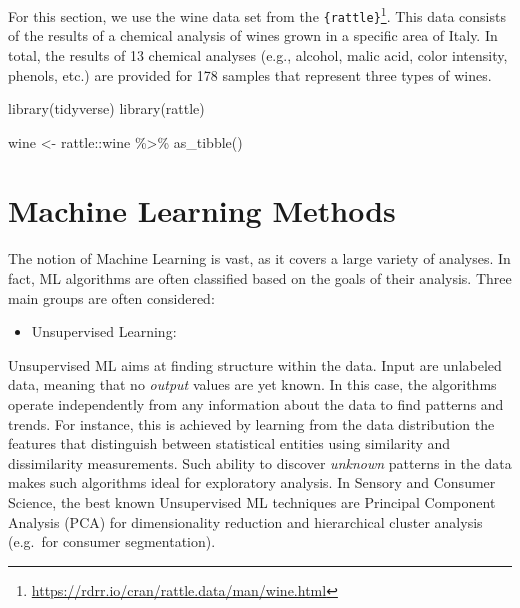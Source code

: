 \documentclass[
]{krantz}
\makeatletter
\newenvironment{Shaded}{\begin{snugshade}}{\end{snugshade}}
\newcommand{\FunctionTok}[1]{\textcolor[rgb]{0,0,0}{#1}}
\newcommand{\NormalTok}[1]{#1}
\newcommand{\OtherTok}[1]{\textcolor[rgb]{0.37,0.37,0.37}{#1}}
\newcommand{\SpecialCharTok}[1]{\textcolor[rgb]{0,0,0}{#1}}
\providecommand{\tightlist}{%
  \setlength{\itemsep}{0pt}\setlength{\parskip}{0pt}}
\renewcommand{\href}[2]{#2\footnote{\url{#1}}}
\newenvironment{kframe}{%
\medskip{}
\setlength{\fboxsep}{.8em}
 \def\at@end@of@kframe{}%
 \ifinner\ifhmode%
  \def\at@end@of@kframe{\end{minipage}}%
  \begin{minipage}{\columnwidth}%
 \fi\fi%
 \def\FrameCommand##1{\hskip\@totalleftmargin \hskip-\fboxsep
 \colorbox{shadecolor}{##1}\hskip-\fboxsep
     \hskip-\linewidth \hskip-\@totalleftmargin \hskip\columnwidth}%
 \MakeFramed {\advance\hsize-\width
   \@totalleftmargin\z@ \linewidth\hsize
   \@setminipage}}%
 {\par\unskip\endMakeFramed%
 \at@end@of@kframe}
\renewenvironment{Shaded}{\begin{kframe}}{\end{kframe}}
\makeatother
\begin{document}
For this section, we use the wine data set from the \href{https://rdrr.io/cran/rattle.data/man/wine.html}{\texttt{\{rattle\}}}. This data consists of the results of a chemical analysis of wines grown in a specific area of Italy. In total, the results of 13 chemical analyses (e.g., alcohol, malic acid, color intensity, phenols, etc.) are provided for 178 samples that represent three types of wines.

\begin{Shaded}
\begin{Highlighting}[]
\FunctionTok{library}\NormalTok{(tidyverse)}
\FunctionTok{library}\NormalTok{(rattle)}

\NormalTok{wine }\OtherTok{\textless{}{-}}\NormalTok{ rattle}\SpecialCharTok{::}\NormalTok{wine }\SpecialCharTok{\%\textgreater{}\%} 
  \FunctionTok{as\_tibble}\NormalTok{()}
\end{Highlighting}
\end{Shaded}

\hypertarget{machine-learning-methods}{%
\section{Machine Learning Methods}\label{machine-learning-methods}}

The notion of Machine Learning is vast, as it covers a large variety of analyses. In fact, ML algorithms are often classified based on the goals of their analysis. Three main groups are often considered:

\begin{itemize}
\tightlist
\item
  Unsupervised Learning:
\end{itemize}

Unsupervised ML aims at finding structure within the data. Input are unlabeled data, meaning that no \emph{output} values are yet known. In this case, the algorithms operate independently from any information about the data to find patterns and trends. For instance, this is achieved by learning from the data distribution the features that distinguish between statistical entities using similarity and dissimilarity measurements.
Such ability to discover \emph{unknown} patterns in the data makes such algorithms ideal for exploratory analysis. In Sensory and Consumer Science, the best known Unsupervised ML techniques are Principal Component Analysis (PCA) for dimensionality reduction and hierarchical cluster analysis (e.g.~for consumer segmentation).
\end{document}
